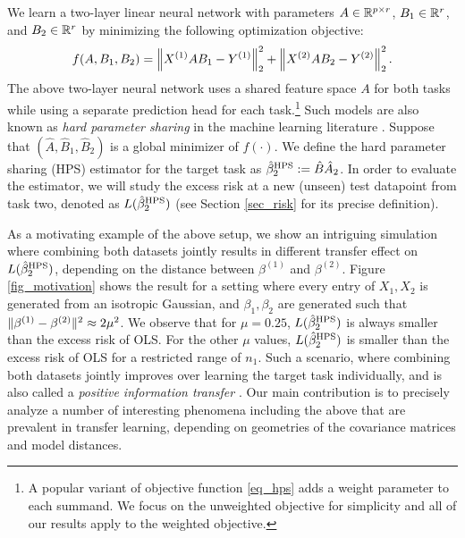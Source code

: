 We learn a two-layer linear neural network with parameters $A \in \mathbb{R}^{p\times r}$, $B_1 \in \mathbb{R}^{r}$, and $B_2 \in \mathbb{R}^r$ by minimizing the following optimization objective:
\begin{align}\label{eq_hps}
    f(A, B_1, B_2) = \bignorm{X^{(1)} A B_1 - Y^{(1)}}_2^2 + \bignorm{X^{(2)} A B_2 - Y^{(2)}}_2^2.
\end{align}
The above two-layer neural network uses a shared feature space $A$ for both tasks while using a separate prediction head for each task.\footnote{A popular variant of objective function \eqref{eq_hps} adds a weight parameter to each summand. We focus on the unweighted objective for simplicity and all of our results apply to the weighted objective.}
Such models are also known as \textit{hard parameter sharing} in the machine learning literature \cite{C97,R17}.
Suppose that $(\hat{A}, \hat{B}_1, \hat{B}_2)$ is a global minimizer of $f(\cdot)$.
We define the hard parameter sharing (HPS) estimator for the target task as $\hat{\beta}_2^{\textup{HPS}} := \hat{B} \hat{A}_2$.
In order to evaluate the estimator, we will study the excess risk at a new (unseen) test datapoint from task two, denoted as $L(\hat{\beta}_2^{\textup{HPS}})$ (see Section \ref{sec_risk} for its precise definition).

As a motivating example of the above setup, we show an intriguing simulation where combining both datasets jointly results in different transfer effect on $L(\hat{\beta}_2^{\textup{HPS}})$, depending on the distance between $\beta^{(1)}$ and $\beta^{(2)}$.
Figure \ref{fig_motivation} shows the result for a setting where every entry of $X_1, X_2$ is generated from an isotropic Gaussian, and $\beta_1,\beta_2$ are generated such that $\|\beta^{(1)} - \beta^{(2)}\|^2 \approx 2\mu^2$.
We observe that for $\mu = 0.25$, $L(\hat{\beta}_2^{\textup{HPS}})$ is always smaller than the excess risk of OLS.
For the other $\mu$ values, $L(\hat{\beta}_2^{\textup{HPS}})$ is smaller than the excess risk of OLS for a restricted range of $n_1$.
Such a scenario, where combining both datasets jointly improves over learning the target task individually, and is also called a \textit{positive information transfer} \cite{PY09}.
Our main contribution is to precisely analyze a number of interesting phenomena including the above that are prevalent in transfer learning, depending on geometries of the covariance matrices and model distances. 


